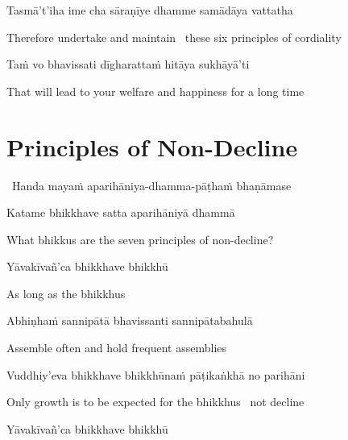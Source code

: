 Tasmā't'iha ime cha sāraṇīye dhamme samādāya vattatha

\begin{english}
  Therefore undertake and maintain \breathmark\ these six principles of cordiality
\end{english}

Taṁ vo bhavissati dīgharattaṁ hitāya sukhāyā'ti

\begin{english}
  That will lead to your welfare and happiness for a long time
\end{english}

\suttaRef{[MN 104]}


\section{Principles of Non-Decline}
\label{principles-of-non-decline}

\begin{leader}
  \anglebracketleft\ \hspace{-0.5mm}Handa mayaṁ aparihāniya-dhamma-pāṭhaṁ bhaṇāmase \hspace{-0.5mm}\anglebracketright\
\end{leader}

Katame bhikkhave satta aparihāniyā dhammā

\begin{english}
  What bhikkus are the seven principles of non-decline?
\end{english}

Yāvakīvañ'ca bhikkhave bhikkhū

\begin{english}
  As long as the bhikkhus
\end{english}

Abhiṇhaṁ sannipātā bhavissanti sannipātabahulā

\begin{english}
  Assemble often and hold frequent assemblies
\end{english}

Vuddhiy'eva bhikkhave bhikkhūnaṁ pāṭikaṅkhā no parihāni

\begin{english}
  Only growth is to be expected for the bhikkhus \breathmark\ not decline
\end{english}

Yāvakīvañ'ca bhikkhave bhikkhū

